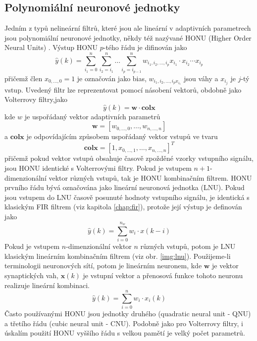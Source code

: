 \subsection{Polynomiální neuronové jednotky}\label{chap:honu}
Jedním z typů nelineární filtrů, které jsou ale lineární v adaptivních parametrech jsou polynomiální neuronové jednotky, někdy též nazývané HONU (Higher Order Neural Units) \cite{honu}. Výstup HONU $p$-tého řádu je difinován jako
\begin{equation}
    \hat{y}(k)=\sum_{i_1=0}^n \sum_{i_2=i_1}^n\dots \sum_{i_p=i_{p-1}}^n w_{i_1,i_2,\dots,i_p}x_{i_1}\cdot x_{i_2} \cdots x_{i_p}
\end{equation}
přičemž člen $x_{0,\dots,0}=1$ je označován jako bias, $w_{{i_1,i_2,\dots,i_p}x_{i_1}}$ jsou váhy a $x_{i_j}$ je $j$-tý vstup. Uvedený filtr lze reprezentovat pomocí násobení vektorů, obdobně jako Volterrovy filtry,jako
\begin{equation}
    \hat{y}(k)=\textbf{w} \cdot \textbf{colx}
\end{equation}
kde $w$ je uspořádaný vektor adaptivních parametrů
\begin{equation}
    \textbf{w}=[w_{0,\dots,0},\dots, w_{n,\dots,n}]
\end{equation}
a $\textbf{colx}$ je odpovídajícím způsobem uspořádaný vektor vstupů ve tvaru
\begin{equation}
    \textbf{colx}= [1,x_{0,\dots,1},\dots,x_{n,\dots,n}]^T
\end{equation}
přičemž pokud vektor vstupů obsahuje časově zpožděné vzorky vstupního signálu, jsou HONU identické s Volterrovými filtry. Pokud je vstupem $n+1$-dimenzionální vektor různých vstupů, tak je HONU kombinačním filtrem. HONU prvního řádu bývá označována jako lineární neuronová jednotka (LNU). Pokud jsou vstupem do LNU časově posunuté hodnoty vstupního signálu, je identická s klasickým FIR filtrem (viz kapitola \ref{chap:fir}), protože její výstup je definován jako
\begin{equation}
    \hat{y}(k)=\sum_{i=0}^{n_w} w_i \cdot x(k-i)
\end{equation}
Pokud je vstupem $n$-dimenzionální vektor $n$ různých vstupů, potom je LNU klasickým lineárním kombinačním filtrem (viz obr. \ref{img:lnu}). Použijeme-li terminologii neuronových sítí, potom je lineárním neuronem, kde $\textbf{w}$ je vektor synaptických vah, $\textbf{x}(k)$ je vstupní vektor a přenosová funkce tohoto neuronu realizuje lineární kombinaci. 
\begin{equation}
    \hat{y}(k)=\sum_{i=0}^n w_i \cdot x_i(k)
\end{equation}
Často používanými HONU jsou jednotky druhého (quadratic neural unit - QNU) a třetího řádu (cubic neural unit - CNU). Podobně jako pro Volterrovy filtry, i úskalím použití HONU vyššího řádu s velkou pamětí je velký počet parametrů. 

